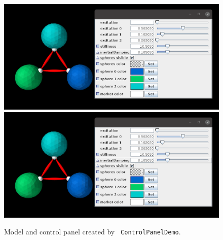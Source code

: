 \begin{figure}[th]
\begin{center}
\iflatexml
 \includegraphics[]{images/ControlPanelDemo}
\else
 \includegraphics[width=6in]{images/ControlPanelDemo}
\fi
\end{center}
\caption{Model and control panel created by {\tt
ControlPanelDemo}.}
\label{controlPanelDemo:fig}
\end{figure}

